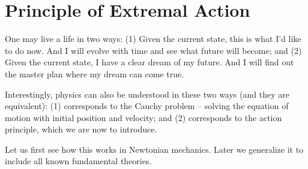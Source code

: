 \section{Principle of Extremal Action}

One may live a life in two ways: (1) Given the current state, this is what I'd like to do now. And I will evolve with time and see what future will become; and (2) Given the current state, I have a clear dream of my future. And I will find out the master plan where my dream can come true.

Interestingly, physics can also be understood in these two ways (and they are equivalent): (1) corresponds to the Cauchy problem -- solving the equation of motion with initial position and velocity; and (2) corresponds to the action principle, which we are now to introduce.


Let us first see how this works in Newtonian mechanics. Later we generalize it to include all known fundamental theories.

